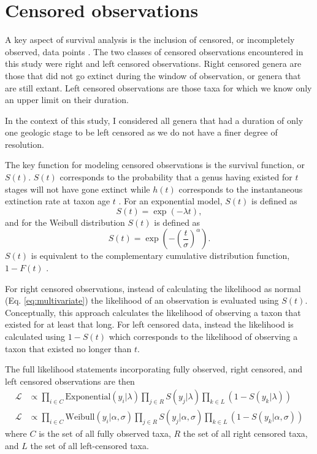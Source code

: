 \documentclass[12pt,letterpaper]{article}
\begin{document}
\section{Censored observations} \label{sec:cen}
A key aspect of survival analysis is the inclusion of censored, or incompletely observed, data points \citep{Ibrahim2001,Klein2003}. The two classes of censored observations encountered in this study were right and left censored observations. Right censored genera are those that did not go extinct during the window of observation, or genera that are still extant. Left censored observations are those taxa for which we know only an upper limit on their duration.

In the context of this study, I considered all genera that had a duration of only one geologic stage to be left censored as we do not have a finer degree of resolution. 

The key function for modeling censored observations is the survival function, or \(S(t)\). \(S(t)\) corresponds to the probability that a genus having existed for \(t\) stages will not have gone extinct while \(h(t)\) corresponds to the instantaneous extinction rate at taxon age \(t\) \cite{Klein2003}. For an exponential model, \(S(t)\) is defined as
\begin{equation}
  S(t) = \exp(-\lambda t),
  \label{eq:exp_surv}
\end{equation}
and for the Weibull distribution \(S(t)\) is defined as
\begin{equation}
  S(t) = \exp\left(-\left(\frac{t}{\sigma}\right)^{\alpha}\right).
  \label{eq:wei_surv}
\end{equation}
\(S(t)\) is equivalent to the complementary cumulative distribution function, \(1 - F(t)\) \citep{Klein2003}. 

For right censored observations, instead of calculating the likelihood as normal (Eq. \ref{eq:multivariate}) the likelihood of an observation is evaluated using \(S(t)\). Conceptually, this approach calculates the likelihood of observing a taxon that existed for at least that long. For left censored data, instead the likelihood is calculated using \(1 - S(t)\) which corresponds to the likelihood of observing a taxon that existed no longer than \(t\).

The full likelihood statements incorporating fully observed, right censored, and left censored observations are then
\begin{equation}
  \begin{aligned}
    \mathcal{L} &\propto \prod_{i \in C} \mathrm{Exponential}(y_{i} | \lambda) \prod_{j \in R} S(y_{j} | \lambda) \prod_{k \in L} \left(1 - S(y_{k} | \lambda)\right) \\
    \mathcal{L} &\propto \prod_{i \in C} \mathrm{Weibull}(y_{i} | \alpha, \sigma) \prod_{j \in R} S(y_{j} | \alpha, \sigma) \prod_{k \in L} \left(1 - S(y_{k} | \alpha, \sigma)\right)
  \end{aligned}
  \label{eq:censored_likelihood}
\end{equation}
where \(C\) is the set of all fully observed taxa, \(R\) the set of all right censored taxa, and \(L\) the set of all left-censored taxa.
\end{document}
